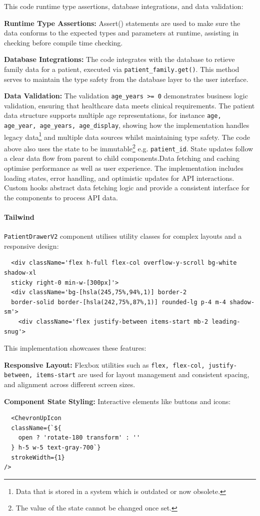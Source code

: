 This code runtime type assertions, database integrations, and data validation:

\textbf{Runtime Type Assertions:} Assert() statements are used to make sure the data conforms to the expected types and parameters at runtime, assisting in checking before compile time checking.

\textbf{Database Integrations:} The code integrates with the database to retieve family data for a patient, executed via \texttt{patient\_family.get()}. This method serves to maintain the type safety from the database layer to the user interface.

\textbf{Data Validation:} The validation \texttt{age\_years >= 0} demonstrates business logic validation, ensuring that healthcare data meets clinical requirements. The patient data structure supports multiple age representations, for instance \texttt{age, age\_year, age\_years, age\_display}, showing how the implementation handles legacy data\footnote{Data that is stored in a system which is outdated or now obsolete.} and multiple data sources whilst maintaining type safety. The code above also uses the state to be immutable\footnote{The value of the state cannot be changed once set.} e.g. \texttt{patient\_id}. State updates follow a clear data flow from parent to child components.Data fetching and caching optimise performance as well as user experience. The implementation includes loading states, error handling, and optimistic updates for API interactions. Custom hooks abstract data fetching logic and provide a consistent interface for the components to process API data.

\paragraph{Tailwind}\mbox{}

\texttt{PatientDrawerV2} component utilises utility classes for complex layouts and a responsive design:

\begin{verbatim}
  <div className='flex h-full flex-col overflow-y-scroll bg-white shadow-xl
  sticky right-0 min-w-[300px]'>
  <div className='bg-[hsla(245,75%,94%,1)] border-2
  border-solid border-[hsla(242,75%,87%,1)] rounded-lg p-4 m-4 shadow-sm'>
    <div className='flex justify-between items-start mb-2 leading-snug'>
\end{verbatim}

This implementation showcases these features:

\textbf{Responsive Layout:} Flexbox utilities such as \texttt{flex, flex-col,
justify-between, items-start}  are used for layout management and consistent spacing, and alignment across different screen sizes.

\textbf{Component State Styling:} Interactive elements like buttons and icons:
\begin{verbatim}
  <ChevronUpIcon
  className={`${
    open ? 'rotate-180 transform' : ''
  } h-5 w-5 text-gray-700`}
  strokeWidth={1}
/>
\end{verbatim}

